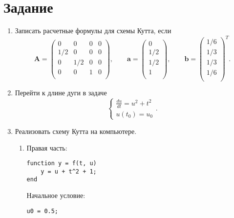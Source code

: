 \section{Задание}
\begin{enumerate}
\item Записать расчетные формулы для схемы Кутта, если
\begin{equation} \nonumber
	\mathbf{A} = 
		\begin{pmatrix}
		0 & 0 & 0 & 0 \\
		1/2 & 0 & 0 & 0 \\
		0 & 1/2 & 0 & 0 \\
		0 & 0 & 1 & 0 \\
		\end{pmatrix},
	\qquad
	\mathbf{a} = 
		\begin{pmatrix}
		0 \\
		1/2 \\
		1/2 \\
		1 \\
		\end{pmatrix},
	\qquad
	\mathbf{b} = 
		\begin{pmatrix}
		1/6 \\
		1/3 \\
		1/3 \\
		1/6 \\
		\end{pmatrix}^T.
\end{equation}
\item Перейти к длине дуги в задаче
\begin{equation} \nonumber
	\begin{cases}
		\displaystyle \frac{du}{dt} = u^2 + t^2 \\
		u(t_0) = u_0
	\end{cases}.
\end{equation}
\item Реализовать схему Кутта на компьютере.
\begin{enumerate}
\item Правая часть: 
\begin{matlablisting}
	\begin{Verbatim}
function y = f(t, u)
    y = u + t^2 + 1;
end
	\end{Verbatim}
\end{matlablisting}
Начальное условие:
\begin{matlablisting}
	\begin{verbatim}
u0 = 0.5;
	\end{verbatim}
\end{matlablisting}

\end{enumerate}
\end{enumerate}

